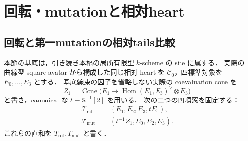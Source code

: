 \section{回転・mutationと相対heart}
\label{sec:qa-relative-rotated-mutated}

\subsection{回転と第一mutationの相対tails比較}
\label{subsec:qa-relative-rotated-mutated-tails}

本節の基底は，引き続き本稿の局所有限型 $k$-scheme の site に属する．
実際の曲線型 square avatar から構成した同じ相対 heart を
$\mathcal C_0$，四標準対象を $E_0,\ldots,E_3$ とする．
基底線束の因子を省略しない実際の coevaluation cone を
\[
 Z_1=\operatorname{Cone}
   \bigl(E_1\longrightarrow\operatorname{Hom}(E_1,E_3)^\vee\otimes E_3\bigr)
\]
と書き，canonical な $t=\mathsf S^{-1}[2]$ を用いる．
次の二つの四項窓を固定する：
\[
 \begin{split}
 \mathcal T_{\mathrm{rot}}&=(E_1,E_2,E_3,tE_0),\\
 \mathcal T_{\mathrm{mut}}&=(t^{-1}Z_1,E_0,E_2,E_3).
 \end{split}
 \tag{RM}\label{eq:qa-relative-rot-mut-windows}
\]
これらの直和を $T_{\mathrm{rot}},T_{\mathrm{mut}}$ と書く．

